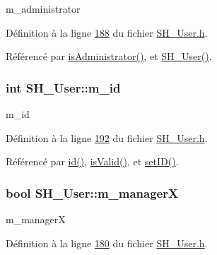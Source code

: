 m\-\_\-administrator 



Définition à la ligne \hyperlink{SH__User_8h_source_l00188}{188} du fichier \hyperlink{SH__User_8h_source}{S\-H\-\_\-\-User.\-h}.



Référencé par \hyperlink{classSH__User_ad2acd7b3caca088be8cab00aee11c0e1}{is\-Administrator()}, et \hyperlink{classSH__User_a96c0ebb3f11c1654935aaecb92295724}{S\-H\-\_\-\-User()}.

\hypertarget{classSH__User_a701e1d1238c488e46e8d1dcc7dbe8dc0}{
\subsubsection[{m\-\_\-id}]{\setlength{\rightskip}{0pt plus 5cm}int S\-H\-\_\-\-User\-::m\-\_\-id\hspace{0.3cm}{\ttfamily [private]}}}\label{classSH__User_a701e1d1238c488e46e8d1dcc7dbe8dc0}


m\-\_\-id 



Définition à la ligne \hyperlink{SH__User_8h_source_l00192}{192} du fichier \hyperlink{SH__User_8h_source}{S\-H\-\_\-\-User.\-h}.



Référencé par \hyperlink{classSH__User_addf3cb1d491eea2df592dee5c9081d32}{id()}, \hyperlink{classSH__User_aa1b7fd66632c13905f3b6fd941505c02}{is\-Valid()}, et \hyperlink{classSH__User_a6523c9c84b0edcbc066a8833e4ddad6d}{set\-I\-D()}.

\hypertarget{classSH__User_ab9c9475b85e1449da1476eb7b4157a4d}{
\subsubsection[{m\-\_\-manager\-X}]{\setlength{\rightskip}{0pt plus 5cm}bool S\-H\-\_\-\-User\-::m\-\_\-manager\-X\hspace{0.3cm}{\ttfamily [private]}}}\label{classSH__User_ab9c9475b85e1449da1476eb7b4157a4d}


m\-\_\-manager\-X 



Définition à la ligne \hyperlink{SH__User_8h_source_l00180}{180} du fichier \hyperlink{SH__User_8h_source}{S\-H\-\_\-\-User.\-h}.



